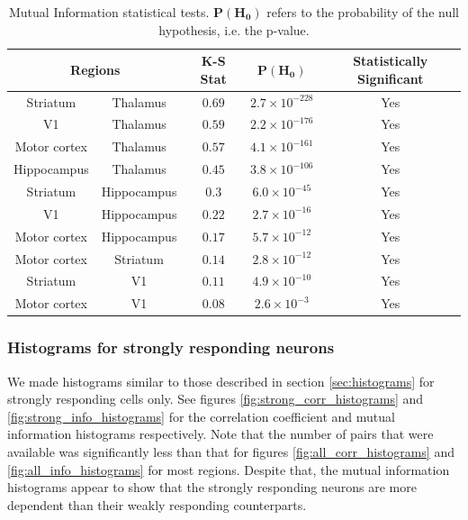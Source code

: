 \documentclass[a4paper,12pt]{article}
\theoremstyle{definition}
\begin{document}
\begin{table}[ht!]
  \begin{center}
    \caption{Mutual Information statistical tests. $\mathbf{P(H_0)}$ refers to the probability of the null hypothesis, i.e. the p-value.}
    \label{tab:info_ks_test}
    \begin{tabular}{c|c|c|c|c} %
      \multicolumn{2}{c|}{\textbf{Regions}} & \textbf{K-S Stat} & $\mathbf{P(H_0)}$ & \textbf{Statistically Significant}\\
      \hline
      Striatum & Thalamus & $0.69$ & $2.7 \times 10^{-228}$ & Yes \\
      V1 & Thalamus  & $0.59$ & $2.2 \times 10^{-176}$ & Yes \\
      Motor cortex & Thalamus & $0.57$ & $4.1 \times 10^{-161}$ & Yes \\
      Hippocampus & Thalamus  & $0.45$ & $3.8 \times 10^{-106}$ & Yes \\
      Striatum & Hippocampus & $0.3$ & $6.0 \times 10^{-45}$ & Yes \\
      V1 & Hippocampus & $0.22$ & $2.7 \times 10^{-16}$ & Yes \\
      Motor cortex & Hippocampus & $0.17$ & $5.7 \times 10^{-12}$ & Yes \\
      Motor cortex & Striatum & $0.14$ & $2.8 \times 10^{-12}$ & Yes \\
      Striatum & V1 & $0.11$ & $4.9 \times 10^{-10}$ & Yes \\
      Motor cortex & V1 & $0.08$ & $2.6 \times 10^{-3}$ & Yes \\
    \end{tabular}
  \end{center}
\end{table}

\subsubsection{Histograms for strongly responding neurons}
We made histograms similar to those described in section \ref{sec:histograms} for strongly responding cells only. See figures \ref{fig:strong_corr_histograms} and \ref{fig:strong_info_histograms} for the correlation coefficient and mutual information histograms respectively. Note that the number of pairs that were available was significantly less than that for figures \ref{fig:all_corr_histograms} and \ref{fig:all_info_histograms} for most regions. Despite that, the mutual information histograms appear to show that the strongly responding neurons are more dependent than their weakly responding counterparts.
\end{document}

